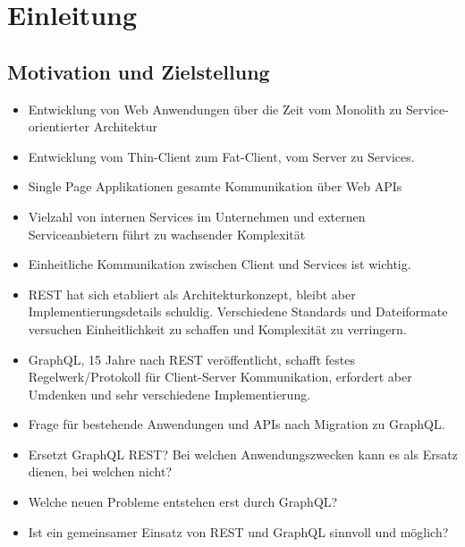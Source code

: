\chapter{Einleitung}

\section{Motivation und Zielstellung}
\begin{itemize}
  \item Entwicklung von Web Anwendungen über die Zeit vom Monolith zu Service-orientierter Architektur
  \item Entwicklung vom Thin-Client zum Fat-Client, vom Server zu Services.
  \item Single Page Applikationen gesamte Kommunikation über Web APIs
  \item Vielzahl von internen Services im Unternehmen und externen Serviceanbietern führt zu wachsender Komplexität
  \item Einheitliche Kommunikation zwischen Client und Services ist wichtig.
  \item REST hat sich etabliert als Architekturkonzept, bleibt aber Implementierungsdetails schuldig. Verschiedene Standards und Dateiformate versuchen Einheitlichkeit zu schaffen und Komplexität zu verringern.
  \item GraphQL, 15 Jahre nach REST veröffentlicht, schafft festes Regelwerk/Protokoll für Client-Server Kommunikation, erfordert aber Umdenken und sehr verschiedene Implementierung.
  \item Frage für bestehende Anwendungen und APIs nach Migration zu GraphQL\@.
  \item Ersetzt GraphQL REST\@? Bei welchen Anwendungszwecken kann es als Ersatz dienen, bei welchen nicht?
  \item Welche neuen Probleme entstehen erst durch GraphQL\@?
  \item Ist ein gemeinsamer Einsatz von REST und GraphQL sinnvoll und möglich?
\end{itemize}
